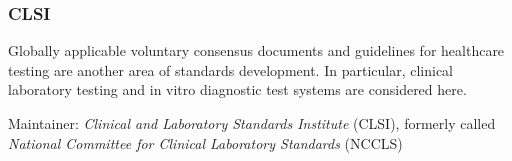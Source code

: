 %
%
%
%
%
%
%

\subsubsection{CLSI}
\label{clsi_heading}

Globally applicable voluntary consensus documents and guidelines for healthcare
testing are another area of standards development. In particular, clinical
laboratory testing and in vitro diagnostic test systems are considered here.
\cite{clsi}

Maintainer: \emph{Clinical and Laboratory Standards Institute} (CLSI), formerly
called \emph{National Committee for Clinical Laboratory Standards} (NCCLS)
